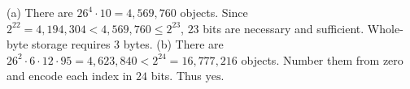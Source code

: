 (a) There are $26^4\cdot10=4{,}569{,}760$ objects. Since $2^{22}=4{,}194{,}304<4{,}569{,}760\le2^{23}$, $23$ bits are necessary and sufficient. Whole-byte storage requires $\boxed3$ bytes.
(b) There are $26^2\cdot6\cdot12\cdot95=4{,}623{,}840<2^{24}=16{,}777{,}216$ objects. Number them from zero and encode each index in $24$ bits. Thus $\boxed{\text{yes}}$.
